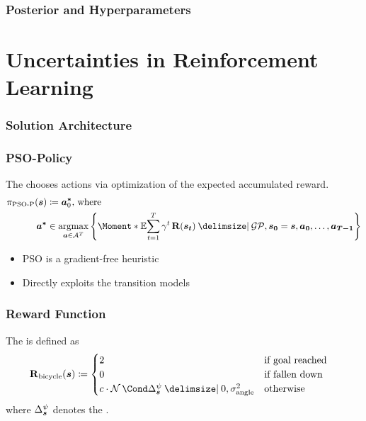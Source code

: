 \begin{frame}[label=gp_hyperparameters]
    \frametitle{Posterior and Hyperparameters}

    \centering
\end{frame}

\section{Uncertainties in Reinforcement Learning}
\begin{frame}[label=solution_architecture]
    \frametitle{Solution Architecture}

    \centering
    
\end{frame}

\begin{frame}[label=solution_psop]
    \frametitle{PSO-Policy}

    \begin{definition}
        \label{def:psop}
        The  chooses actions via optimization of the expected accumulated reward.
        \begin{align}
            \pi_{\text{PSO-P}}(\mat{s}) &\coloneqq \mat{a^\ast}_0\text{, where} \\
            \mat{a^\ast} &\in \argmax_{\mat{a} \in \Ah^T} \left\{ \Moment*{\E}{\sum_{t=1}^T \gamma^t \Rwd(\mat{s_t}) \given \GP, \mat{s_0} = \mat{s}, \mat{a_0}, \dots, \mat{a_{T-1}}} \right\}
        \end{align}
    \end{definition}
    \begin{itemize}
        \item PSO is a gradient-free heuristic
        \item Directly exploits the transition models
    \end{itemize}
\end{frame}

\begin{frame}[label=solution_reward]
    \frametitle{Reward Function}

    \begin{definition}
        The  is defined as
        \begin{align}
            \RwdBicycle(\mat{s}) &\coloneqq \begin{cases}
                    2 & \text{if goal reached} \\
                    0 & \text{if fallen down} \\
                    c\cdot\Gaussian{\Delta^\psi_{\mat{s}} \given 0, \sigma_{\text{angle}}^2} & \text{otherwise}
                \end{cases}
        \end{align}
    where $\Delta^\psi_{\bm{s}}$ denotes the .
    \end{definition}
    \vspace{2ex}
    \centering
    
\end{frame}

